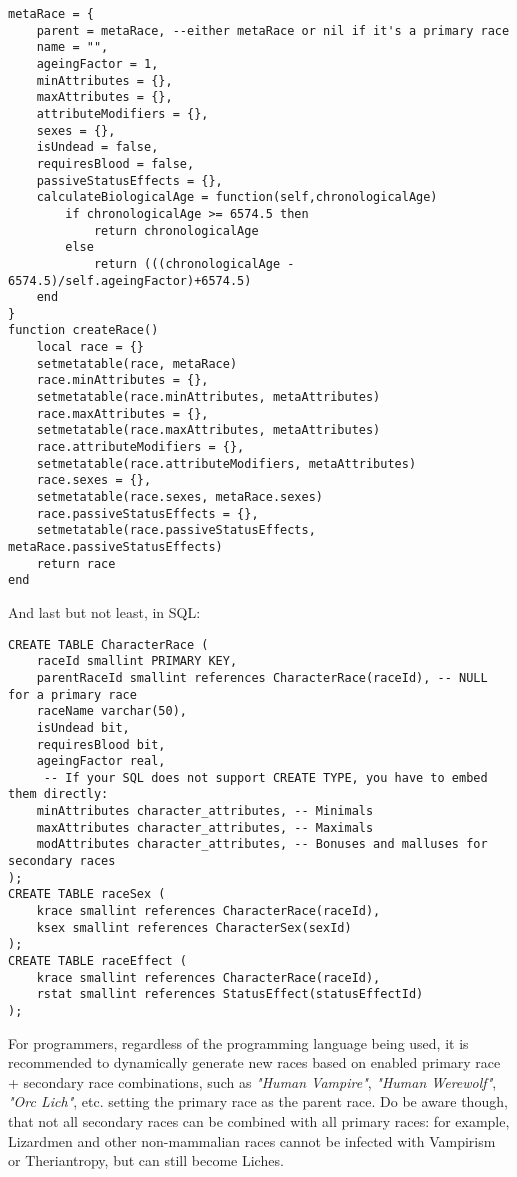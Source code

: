 \documentclass[openany,11pt,a4paper]{book}
\begin{document}
\begin{lstlisting}[style=LuaStyle]
metaRace = {
	parent = metaRace, --either metaRace or nil if it's a primary race
	name = "",
	ageingFactor = 1,
	minAttributes = {},
	maxAttributes = {},
	attributeModifiers = {},
	sexes = {},
	isUndead = false,
	requiresBlood = false,
	passiveStatusEffects = {},
	calculateBiologicalAge = function(self,chronologicalAge)
		if chronologicalAge >= 6574.5 then
			return chronologicalAge
		else
			return (((chronologicalAge - 6574.5)/self.ageingFactor)+6574.5)
	end
}
function createRace()
	local race = {}
	setmetatable(race, metaRace)
	race.minAttributes = {},
	setmetatable(race.minAttributes, metaAttributes)
	race.maxAttributes = {},
	setmetatable(race.maxAttributes, metaAttributes)
	race.attributeModifiers = {},
	setmetatable(race.attributeModifiers, metaAttributes)
	race.sexes = {},
	setmetatable(race.sexes, metaRace.sexes)
	race.passiveStatusEffects = {},
	setmetatable(race.passiveStatusEffects, metaRace.passiveStatusEffects)
	return race
end
\end{lstlisting}
And last but not least, in SQL:
\begin{lstlisting}[style=SqlStyle]
CREATE TABLE CharacterRace (
	raceId smallint PRIMARY KEY,
	parentRaceId smallint references CharacterRace(raceId), -- NULL for a primary race
	raceName varchar(50),
	isUndead bit,
	requiresBlood bit,
	ageingFactor real,
	 -- If your SQL does not support CREATE TYPE, you have to embed them directly:
	minAttributes character_attributes, -- Minimals
	maxAttributes character_attributes, -- Maximals
	modAttributes character_attributes, -- Bonuses and malluses for secondary races
);
CREATE TABLE raceSex (
	krace smallint references CharacterRace(raceId),
	ksex smallint references CharacterSex(sexId)
);
CREATE TABLE raceEffect (
	krace smallint references CharacterRace(raceId),
	rstat smallint references StatusEffect(statusEffectId)
);
\end{lstlisting}
For programmers, regardless of the programming language being used, it is recommended to dynamically generate new races based on enabled primary race + secondary race combinations, such as \textit{"Human Vampire"}, \textit{"Human Werewolf"}, \textit{"Orc Lich"}, etc. setting the primary race as the parent race. Do be aware though, that not all secondary races can be combined with all primary races: for example, Lizardmen and other non-mammalian races cannot be infected with Vampirism or Theriantropy, but can still become Liches. 
\end{document}
